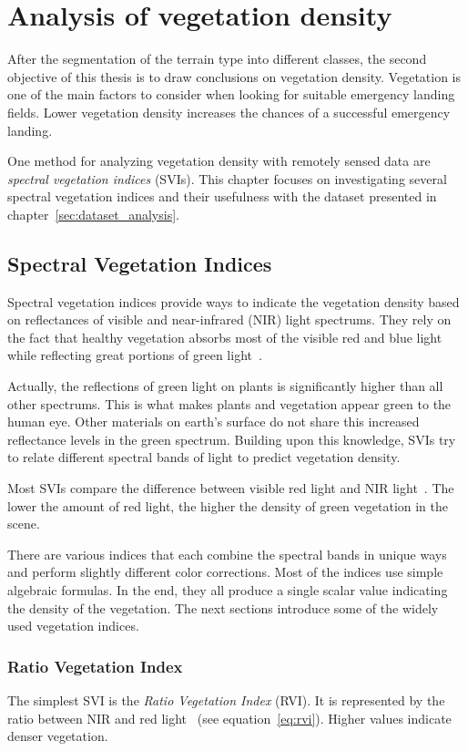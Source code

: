 \section{Analysis of vegetation density}
\label{sec:vegetation_analysis}
After the segmentation of the terrain type into different classes, the second objective of this thesis is to draw conclusions on vegetation density. Vegetation is one of the main factors to consider when looking for suitable emergency landing fields. Lower vegetation density increases the chances of a successful emergency landing.

One method for analyzing vegetation density with remotely sensed data are \emph{spectral vegetation indices} (SVIs). This chapter focuses on investigating several spectral vegetation indices and their usefulness with the dataset presented in chapter~\ref{sec:dataset_analysis}.

\subsection{Spectral Vegetation Indices}
Spectral vegetation indices provide ways to indicate the vegetation density based on reflectances of visible and near-infrared (NIR) light spectrums. They rely on the fact that healthy vegetation absorbs most of the visible red and blue light while reflecting great portions of green light~\cite{glv03}.

Actually, the reflections of green light on plants is significantly higher than all other spectrums. This is what makes plants and vegetation appear green to the human eye. Other materials on earth's surface do not share this increased reflectance levels in the green spectrum. Building upon this knowledge, SVIs try to relate different spectral bands of light to predict vegetation density.

Most SVIs compare the difference between visible red light and NIR light~\cite{glv03}. The lower the amount of red light, the higher the density of green vegetation in the scene.

There are various indices that each combine the spectral bands in unique ways and perform slightly different color corrections. Most of the indices use simple algebraic formulas. In the end, they all produce a single scalar value indicating the density of the vegetation. The next sections introduce some of the widely used vegetation indices.

\subsubsection{Ratio Vegetation Index}
The simplest SVI is the \emph{Ratio Vegetation Index} (RVI). It is represented by the ratio between NIR and red light~\cite{glv03} (see equation~\ref{eq:rvi}). Higher values indicate denser vegetation.

